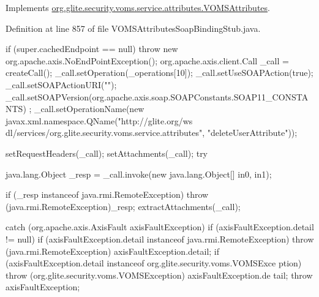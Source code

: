 Implements \hyperlink{interfaceorg_1_1glite_1_1security_1_1voms_1_1service_1_1attributes_1_1VOMSAttributes_a85c08333fea913f9eb05ff1da01e49c2}{org.glite.security.voms.service.attributes.VOMSAttributes}.



Definition at line 857 of file VOMSAttributesSoapBindingStub.java.


\begin{DoxyCode}
                                                                                 
                                                                                       
       {
        if (super.cachedEndpoint == null) {
            throw new org.apache.axis.NoEndPointException();
        }
        org.apache.axis.client.Call _call = createCall();
        _call.setOperation(_operations[10]);
        _call.setUseSOAPAction(true);
        _call.setSOAPActionURI("");
        _call.setSOAPVersion(org.apache.axis.soap.SOAPConstants.SOAP11_CONSTANTS)
      ;
        _call.setOperationName(new javax.xml.namespace.QName("http://glite.org/ws
      dl/services/org.glite.security.voms.service.attributes", "deleteUserAttribute"));
      

        setRequestHeaders(_call);
        setAttachments(_call);
 try {        java.lang.Object _resp = _call.invoke(new java.lang.Object[] {in0, 
      in1});

        if (_resp instanceof java.rmi.RemoteException) {
            throw (java.rmi.RemoteException)_resp;
        }
        extractAttachments(_call);
  } catch (org.apache.axis.AxisFault axisFaultException) {
    if (axisFaultException.detail != null) {
        if (axisFaultException.detail instanceof java.rmi.RemoteException) {
              throw (java.rmi.RemoteException) axisFaultException.detail;
         }
        if (axisFaultException.detail instanceof org.glite.security.voms.VOMSExce
      ption) {
              throw (org.glite.security.voms.VOMSException) axisFaultException.de
      tail;
         }
   }
  throw axisFaultException;
}
    }
\end{DoxyCode}
